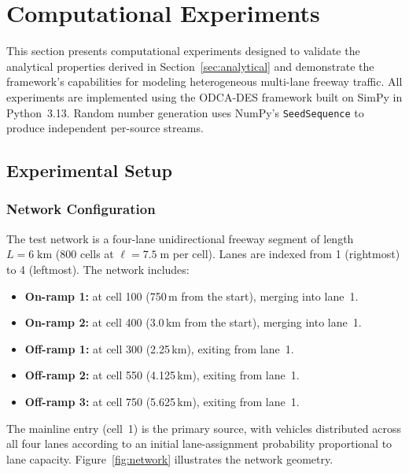 \documentclass[review,number]{elsarticle}
\begin{document}
\section{Computational Experiments}
\label{sec:experiments}

This section presents computational experiments designed to validate the analytical properties derived in Section~\ref{sec:analytical} and demonstrate the framework's capabilities for modeling heterogeneous multi-lane freeway traffic. All experiments are implemented using the ODCA-DES framework built on SimPy \citep{simpy2023} in Python~3.13. Random number generation uses NumPy's \texttt{SeedSequence} to produce independent per-source streams.

\subsection{Experimental Setup}
\label{sec:exp_setup}

\subsubsection{Network Configuration}

The test network is a four-lane unidirectional freeway segment of length $L = 6\;\text{km}$ (800 cells at $\ell = 7.5\;\text{m}$ per cell). Lanes are indexed from 1 (rightmost) to 4 (leftmost). The network includes:
\begin{itemize}
    \item \textbf{On-ramp 1:} at cell 100 (750\,m from the start), merging into lane~1.
    \item \textbf{On-ramp 2:} at cell 400 (3.0\,km from the start), merging into lane~1.
    \item \textbf{Off-ramp 1:} at cell 300 (2.25\,km), exiting from lane~1.
    \item \textbf{Off-ramp 2:} at cell 550 (4.125\,km), exiting from lane~1.
    \item \textbf{Off-ramp 3:} at cell 750 (5.625\,km), exiting from lane~1.
\end{itemize}

The mainline entry (cell~1) is the primary source, with vehicles distributed across all four lanes according to an initial lane-assignment probability proportional to lane capacity. Figure~\ref{fig:network} illustrates the network geometry.
\end{document}
